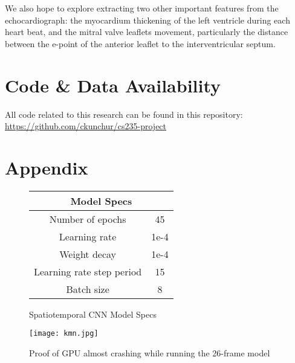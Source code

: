 \documentclass{article}
\begin{document}
We also hope to explore extracting two other important features from the echocardiograph: the myocardium thickening of the left ventricle during each heart beat, and the mitral valve leaflets movement, particularly the distance between the e-point of the anterior leaflet to the interventricular septum. 

\section{Code \& Data Availability}\label{sec5}

All code related to this research can be found in this
repository:  \href{https://github.com/ckunchur/cs235-project}{https://github.com/ckunchur/cs235-project}

\section{Appendix}
\begin{figure} [H]
\begin{center}
\begin{tabular}{ |c c| }
 \hline
 \multicolumn{2}{|c|}{Model Specs} \\
 \hline
 Number of epochs & 45 \\ 
 Learning rate & 1e-4 \\  
 Weight decay & 1e-4 \\   
 Learning rate step period & 15 \\
 Batch size & 8 \\
 \hline
\end{tabular}
\end{center}
  \caption{Spatiotemporal CNN Model Specs}
\end{figure}

\begin{figure} [H]
  \centering
  \texttt{[image: kmn.jpg]}
  \caption{Proof of GPU almost crashing while running the 26-frame model}
\end{figure}


\newpage


\end{document}
